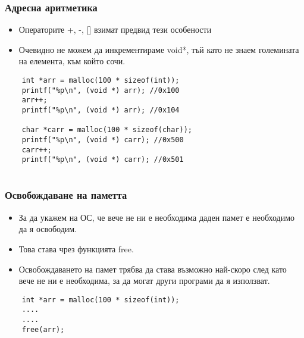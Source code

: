 \documentclass[ignorenonframetext, hyperref=unicode]{beamer}
\begin{document}
\begin{frame}[containsverbatim]
\frametitle{Адресна аритметика}
\begin{itemize}
	\item Операторите +, -, [] взимат предвид тези особености
	\item Очевидно не можем да инкрементираме void*, тъй като не знаем големината на елемента, към който сочи.
\end{itemize}
\begin{lstlisting}
	int *arr = malloc(100 * sizeof(int));
	printf("%p\n", (void *) arr); //0x100
	arr++;
	printf("%p\n", (void *) arr); //0x104
	
	char *carr = malloc(100 * sizeof(char));
	printf("%p\n", (void *) carr); //0x500
	carr++;
	printf("%p\n", (void *) carr); //0x501
	
\end{lstlisting}
\end{frame}

\begin{frame}[containsverbatim]
\frametitle{Освобождаване на паметта}
\begin{itemize}
	\item За да укажем на ОС, че вече не ни е необходима даден памет е необходимо да я освободим.
	\item Това става чрез функцията free.
	\item Освобождаването на памет трябва да става възможно най-скоро след като вече не ни е необходима, за да могат други програми да я използват.
\end{itemize}
\begin{lstlisting}
	int *arr = malloc(100 * sizeof(int));
	....
	....
	free(arr);
\end{lstlisting}
\end{frame}
\end{document}
